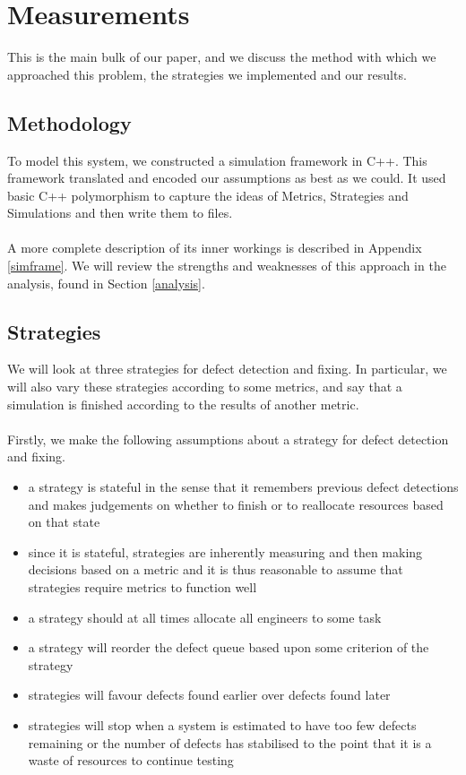 \section{Measurements}

This is the main bulk of our paper, and we discuss the method with which we approached this problem,
the strategies we implemented and our results.

\subsection{Methodology}

To model this system, we constructed a simulation framework in C++.
This framework translated and encoded our assumptions as best as we could.
It used basic C++ polymorphism to capture the ideas of Metrics, Strategies and Simulations and then
write them to files.\\
\\
A more complete description of its inner workings is described in Appendix \ref{simframe}.
We will review the strengths and weaknesses of this approach in the analysis, found in Section
\ref{analysis}.

\subsection{Strategies}

We will look at three strategies for defect detection and fixing.
In particular, we will also vary these strategies according to some metrics, and say that a
simulation is finished according to the results of another metric.\\
\\
Firstly, we make the following assumptions about a strategy for defect detection and fixing.
\begin{itemize}
	\item a strategy is stateful in the sense that it remembers previous defect detections and makes
judgements on whether to finish or to reallocate resources based on that state
	\item since it is stateful, strategies are inherently measuring and then making decisions based on
a metric and it is thus reasonable to assume that strategies require metrics to function well
	\item a strategy should at all times allocate all engineers to some task
	\item a strategy will reorder the defect queue based upon some criterion of the strategy
	\item strategies will favour defects found earlier over defects found later
	\item strategies will stop when a system is estimated to have too few defects remaining or the
number of defects has stabilised to the point that it is a waste of resources to continue testing
\end{itemize}

